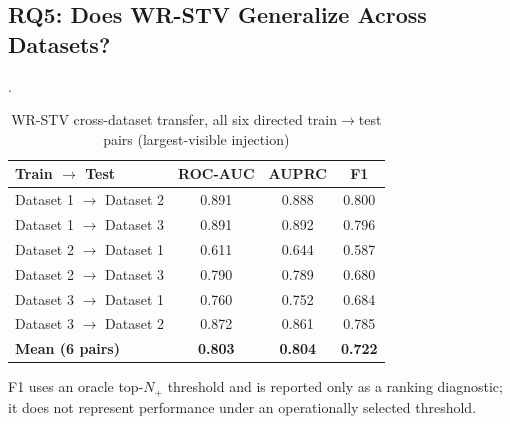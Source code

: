 \documentclass[informatics,article,submit,moreauthors]{Definitions/mdpi}
\newcommand{\rev}[1]{{\color{revisionblue}#1}}
\begin{document}
\subsection{RQ5: Does WR-STV Generalize Across Datasets?}
\begin{table}[t]
	\centering
	\caption{WR-STV cross-dataset transfer, all six directed train$\rightarrow$test
		pairs (largest-visible injection)}.
	\label{tab:cross-pairs}
	\begin{tabular}{lccc}
		\toprule
		\textbf{Train $\rightarrow$ Test} & \textbf{ROC-AUC} & \textbf{AUPRC} & \textbf{F1} \\
		\midrule
		Dataset 1 $\rightarrow$ Dataset 2 & 0.891 & 0.888 & 0.800 \\
		Dataset 1 $\rightarrow$ Dataset 3 & 0.891 & 0.892 & 0.796 \\
		Dataset 2 $\rightarrow$ Dataset 1 & 0.611 & 0.644 & 0.587 \\
		Dataset 2 $\rightarrow$ Dataset 3 & 0.790 & 0.789 & 0.680 \\
		Dataset 3 $\rightarrow$ Dataset 1 & 0.760 & 0.752 & 0.684 \\
		Dataset 3 $\rightarrow$ Dataset 2 & 0.872 & 0.861 & 0.785 \\
		\midrule
		\textbf{Mean (6 pairs)} & \textbf{0.803} & \textbf{0.804} & \textbf{0.722} \\
		\bottomrule
	\end{tabular}

	\vspace{3pt}
	\footnotesize
	\rev{F1 uses an oracle top-\(N_{+}\) threshold and is reported only as
	a ranking diagnostic; it does not represent performance under an
	operationally selected threshold.}
\end{table}
\end{document}
